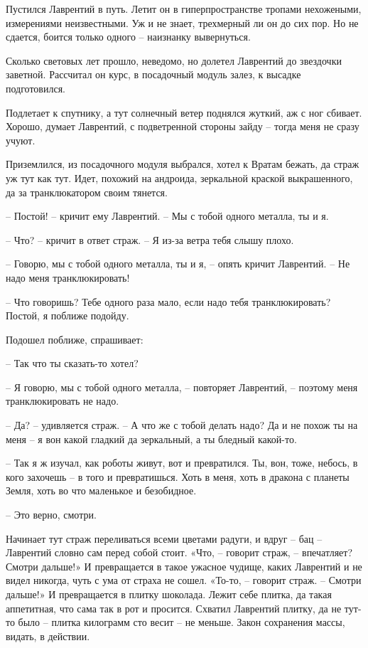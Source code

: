 \documentclass[ebook,oneside,final,openright]{memoir}
\begin{document}
\par
Пустился Лаврентий в путь. Летит он в гиперпространстве тропами нехожеными, измерениями неизвестными. Уж и не знает, трехмерный ли он до сих пор. Но не сдается, боится только одного – наизнанку вывернуться.\par
\par
Сколько световых лет прошло, неведомо, но долетел Лаврентий до звездочки заветной. Рассчитал он курс, в посадочный модуль залез, к высадке подготовился.\par
\par
Подлетает к спутнику, а тут солнечный ветер поднялся жуткий, аж с ног сбивает. Хорошо, думает Лаврентий, с подветренной стороны зайду – тогда меня не сразу учуют. \par
\par
 Приземлился, из посадочного модуля выбрался, хотел к Вратам бежать, да страж уж тут как тут. Идет, похожий на андроида, зеркальной краской выкрашенного, да за транклюкатором своим тянется. \par
 \par
– Постой! – кричит ему Лаврентий. – Мы с тобой одного металла, ты и я. \par
– Что? – кричит в ответ страж. – Я из-за ветра тебя слышу плохо. \par
– Говорю, мы с тобой одного металла, ты и я, – опять кричит Лаврентий. – Не надо меня транклюкировать!\par
– Что говоришь? Тебе одного раза мало, если надо тебя транклюкировать? Постой, я поближе подойду. \par
Подошел поближе, спрашивает: \par
– Так что ты сказать-то хотел? \par
– Я говорю, мы с тобой одного металла, – повторяет Лаврентий, – поэтому меня транклюкировать не надо. \par
– Да? – удивляется страж. – А что же с тобой делать надо? Да и не похож ты на меня – я вон какой гладкий да зеркальный, а ты бледный какой-то. \par
– Так я ж изучал, как роботы живут, вот и превратился. Ты, вон, тоже, небось, в кого захочешь – в того и превратишься. Хоть в меня, хоть в дракона с планеты Земля, хоть во что маленькое и безобидное. \par
– Это верно, смотри. \par
\par
Начинает тут страж переливаться всеми цветами радуги, и вдруг – бац – Лаврентий словно сам перед собой стоит. «Что, – говорит страж, – впечатляет? Смотри дальше!» И превращается в такое ужасное чудище, каких Лаврентий и не видел никогда, чуть с ума от страха не сошел. «То-то, – говорит страж. – Смотри дальше!» И превращается в плитку шоколада. Лежит себе плитка, да такая аппетитная, что сама так в рот и просится. Схватил Лаврентий плитку, да не тут-то было – плитка килограмм сто весит – не меньше. Закон сохранения массы, видать, в действии. \par
\end{document}
